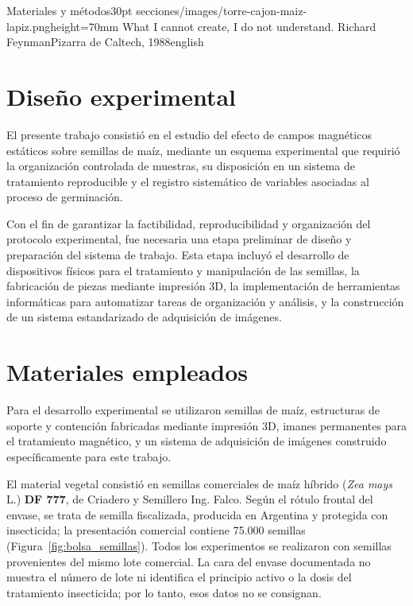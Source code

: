 \aperturacapitulo
  {Materiales y métodos}{30pt}
  {secciones/images/torre-cajon-maiz-lapiz.png}{height=70mm}
  {What I cannot create, I do not understand.}
  {Richard Feynman}{Pizarra de Caltech, 1988}{english}


\section{Diseño experimental}

El presente trabajo consistió en el estudio del efecto de campos magnéticos estáticos sobre semillas de maíz, mediante un esquema experimental que requirió la organización controlada de muestras, su disposición en un sistema de tratamiento reproducible y el registro sistemático de variables asociadas al proceso de germinación.

Con el fin de garantizar la factibilidad, reproducibilidad y organización del protocolo experimental, fue necesaria una etapa preliminar de diseño y preparación del sistema de trabajo. Esta etapa incluyó el desarrollo de dispositivos físicos para el tratamiento y manipulación de las semillas, la fabricación de piezas mediante impresión 3D, la implementación de herramientas informáticas para automatizar tareas de organización y análisis, y la construcción de un sistema estandarizado de adquisición de imágenes.

\section{Materiales empleados}

Para el desarrollo experimental se utilizaron semillas de maíz, estructuras de soporte y contención fabricadas mediante impresión 3D, imanes permanentes para el tratamiento magnético, y un sistema de adquisición de imágenes construido específicamente para este trabajo.

El material vegetal consistió en semillas comerciales de maíz híbrido (\textit{Zea mays} L.) \textbf{DF 777}, de Criadero y Semillero Ing. Falco. Según el rótulo frontal del envase, se trata de semilla fiscalizada, producida en Argentina y protegida con insecticida; la presentación comercial contiene 75.000 semillas (Figura~\ref{fig:bolsa_semillas}). Todos los experimentos se realizaron con semillas provenientes del mismo lote comercial. La cara del envase documentada no muestra el número de lote ni identifica el principio activo o la dosis del tratamiento insecticida; por lo tanto, esos datos no se consignan.

